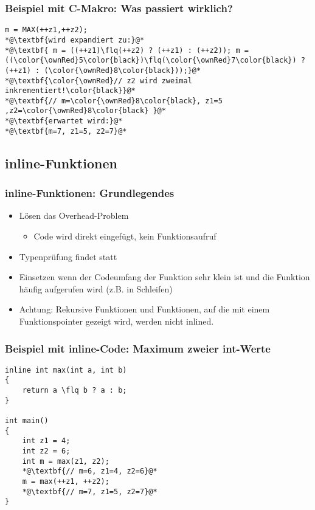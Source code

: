 \subsubsection{Beispiel mit C-Makro: Was passiert wirklich?\hfill}
\label{sec:unterunterabschnitt}
\noindent
\begin{minipage}{\linewidth}
\begin{lstlisting}
m = MAX(++z1,++z2);
*@\textbf{wird expandiert zu:}@*
*@\textbf{ m = ((++z1)\flq(++z2) ? (++z1) : (++z2)); m = ((\color{\ownRed}5\color{black})\flq(\color{\ownRed}7\color{black}) ? (++z1) : (\color{\ownRed}8\color{black}));}@*
*@\textbf{\color{\ownRed}// z2 wird zweimal inkrementiert!\color{black}}@*
*@\textbf{// m=\color{\ownRed}8\color{black}, z1=5 ,z2=\color{\ownRed}8\color{black} }@*
*@\textbf{erwartet wird:}@*
*@\textbf{m=7, z1=5, z2=7}@*
\end{lstlisting}
\end{minipage}


\subsection{inline-Funktionen\hfill}
\label{sec:unterabschnitt}

\subsubsection{inline-Funktionen: Grundlegendes\hfill}
\label{sec:unterunterabschnitt}
\begin{itemize}
	\item Lösen das Overhead-Problem
	\begin{itemize}
		\item Code wird direkt eingefügt, kein Funktionsaufruf
	\end{itemize}
	\item Typenprüfung findet statt
	\item Einsetzen wenn der Codeumfang der Funktion sehr klein ist und die Funktion häufig aufgerufen wird (z.B. in Schleifen)
	\item Achtung: Rekursive Funktionen und Funktionen, auf die mit einem Funktionspointer gezeigt wird, werden nicht inlined.
\end{itemize}

\subsubsection{Beispiel mit inline-Code: Maximum zweier int-Werte}
\label{sec:unterunterabschnitt}
\noindent
\begin{minipage}{\linewidth}
\begin{lstlisting}
inline int max(int a, int b)
{
	return a \flq b ? a : b;
}

int main()
{
	int z1 = 4;
	int z2 = 6;
	int m = max(z1, z2);
	*@\textbf{// m=6, z1=4, z2=6}@*
	m = max(++z1, ++z2);
	*@\textbf{// m=7, z1=5, z2=7}@*
}
\end{lstlisting}
\end{minipage}

